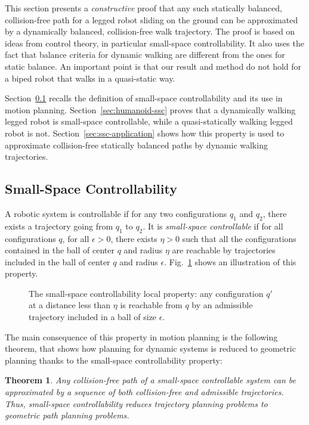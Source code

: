 \documentclass{article}
\newtheorem{theorem}{Theorem}
\begin{document}
This section presents a \textit{constructive} proof that any such statically balanced, 
collision-free path for a legged robot sliding
on the ground can be approximated by a  dynamically balanced, collision-free walk trajectory.
The proof is based on ideas from control theory, in particular small-space 
controllability. It also uses the fact that balance criteria for dynamic walking are different
from the ones for static balance. An important point is that our result and method do not hold
for a biped robot that walks in a quasi-static way. 

Section~\ref{sec:ssc} recalls the definition of small-space controllability and its
use in motion planning. Section~\ref{sec:humanoid-ssc} proves that a
dynamically walking legged robot is small-space controllable, while a quasi-statically
walking legged robot is not. Section~\ref{sec:ssc-application} shows how this property is used to
approximate collision-free statically balanced paths by dynamic walking trajectories.


\subsection{Small-Space Controllability}
\label{sec:ssc} 

A  robotic system  is  controllable  if  for any two  configurations
$q_1$ and $q_2$,  there exists  a
trajectory  going  from  $q_1$ to  $q_2$.  It  is  
\textit{small-space  controllable} if for all configurations  $q$, 
for all $\epsilon >0$, there
exists $\eta >0$ such that all the configurations contained in the ball of center
$q$ and radius $\eta$ are reachable by trajectories included in the
ball of center $q$ and radius $\epsilon$. Fig.~\ref{fig:ssc1} shows an illustration
of this property.

\begin{figure}[h]
  \centering
  

  \caption{The small-space controllability local property:  any configuration $q'$ 
    at a distance less than
    $\eta$ is reachable from $q$ by an admissible trajectory included in
    a ball of size $\epsilon$.}
  \label{fig:ssc1}
\end{figure}

The main  consequence of  this property  
in  motion planning  is the following theorem, that shows how planning for
dynamic systems is reduced to geometric planning
thanks to the small-space controllability property:

\begin{theorem}
  \label{thm:ssc}
  Any collision-free path of a small-space controllable system can be approximated
  by a sequence of both collision-free and admissible trajectories. Thus, small-space 
  controllability reduces trajectory planning problems to geometric path planning problems.
\end{theorem}
\end{document}
